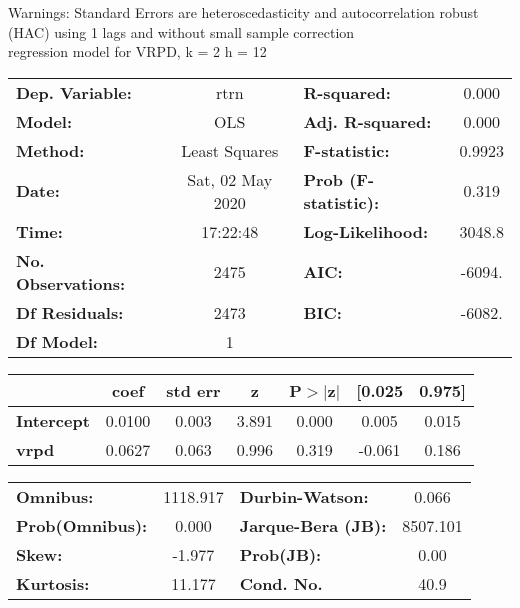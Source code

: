 Warnings: \newline
 [1] Standard Errors are heteroscedasticity and autocorrelation robust (HAC) using 1 lags and without small sample correction\\ 

regression model for VRPD, k = 2 h = 12\begin{center}
\begin{tabular}{lclc}
\toprule
\textbf{Dep. Variable:}    &       rtrn       & \textbf{  R-squared:         } &     0.000   \\
\textbf{Model:}            &       OLS        & \textbf{  Adj. R-squared:    } &     0.000   \\
\textbf{Method:}           &  Least Squares   & \textbf{  F-statistic:       } &    0.9923   \\
\textbf{Date:}             & Sat, 02 May 2020 & \textbf{  Prob (F-statistic):} &    0.319    \\
\textbf{Time:}             &     17:22:48     & \textbf{  Log-Likelihood:    } &    3048.8   \\
\textbf{No. Observations:} &        2475      & \textbf{  AIC:               } &    -6094.   \\
\textbf{Df Residuals:}     &        2473      & \textbf{  BIC:               } &    -6082.   \\
\textbf{Df Model:}         &           1      & \textbf{                     } &             \\
\bottomrule
\end{tabular}
\begin{tabular}{lcccccc}
                   & \textbf{coef} & \textbf{std err} & \textbf{z} & \textbf{P$> |$z$|$} & \textbf{[0.025} & \textbf{0.975]}  \\
\midrule
\textbf{Intercept} &       0.0100  &        0.003     &     3.891  &         0.000        &        0.005    &        0.015     \\
\textbf{vrpd}      &       0.0627  &        0.063     &     0.996  &         0.319        &       -0.061    &        0.186     \\
\bottomrule
\end{tabular}
\begin{tabular}{lclc}
\textbf{Omnibus:}       & 1118.917 & \textbf{  Durbin-Watson:     } &    0.066  \\
\textbf{Prob(Omnibus):} &   0.000  & \textbf{  Jarque-Bera (JB):  } & 8507.101  \\
\textbf{Skew:}          &  -1.977  & \textbf{  Prob(JB):          } &     0.00  \\
\textbf{Kurtosis:}      &  11.177  & \textbf{  Cond. No.          } &     40.9  \\
\bottomrule
\end{tabular}
\end{center}

